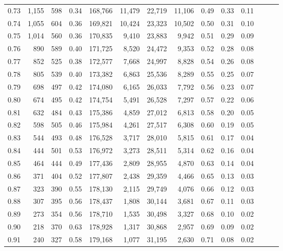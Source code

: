 \begin{tabular}{rrrrrrrrrrrrrr}
0.73 &  1,155 &  598 &  0.34 &  168,766 &   11,479 &  22,719 &  11,106 &  0.49 &  0.33 &      0.11 \\
0.74 &  1,055 &  604 &  0.36 &  169,821 &   10,424 &  23,323 &  10,502 &  0.50 &  0.31 &      0.10 \\
0.75 &  1,014 &  560 &  0.36 &  170,835 &    9,410 &  23,883 &   9,942 &  0.51 &  0.29 &      0.09 \\
0.76 &    890 &  589 &  0.40 &  171,725 &    8,520 &  24,472 &   9,353 &  0.52 &  0.28 &      0.08 \\
0.77 &    852 &  525 &  0.38 &  172,577 &    7,668 &  24,997 &   8,828 &  0.54 &  0.26 &      0.08 \\
0.78 &    805 &  539 &  0.40 &  173,382 &    6,863 &  25,536 &   8,289 &  0.55 &  0.25 &      0.07 \\
0.79 &    698 &  497 &  0.42 &  174,080 &    6,165 &  26,033 &   7,792 &  0.56 &  0.23 &      0.07 \\
0.80 &    674 &  495 &  0.42 &  174,754 &    5,491 &  26,528 &   7,297 &  0.57 &  0.22 &      0.06 \\
0.81 &    632 &  484 &  0.43 &  175,386 &    4,859 &  27,012 &   6,813 &  0.58 &  0.20 &      0.05 \\
0.82 &    598 &  505 &  0.46 &  175,984 &    4,261 &  27,517 &   6,308 &  0.60 &  0.19 &      0.05 \\
0.83 &    544 &  493 &  0.48 &  176,528 &    3,717 &  28,010 &   5,815 &  0.61 &  0.17 &      0.04 \\
0.84 &    444 &  501 &  0.53 &  176,972 &    3,273 &  28,511 &   5,314 &  0.62 &  0.16 &      0.04 \\
0.85 &    464 &  444 &  0.49 &  177,436 &    2,809 &  28,955 &   4,870 &  0.63 &  0.14 &      0.04 \\
0.86 &    371 &  404 &  0.52 &  177,807 &    2,438 &  29,359 &   4,466 &  0.65 &  0.13 &      0.03 \\
0.87 &    323 &  390 &  0.55 &  178,130 &    2,115 &  29,749 &   4,076 &  0.66 &  0.12 &      0.03 \\
0.88 &    307 &  395 &  0.56 &  178,437 &    1,808 &  30,144 &   3,681 &  0.67 &  0.11 &      0.03 \\
0.89 &    273 &  354 &  0.56 &  178,710 &    1,535 &  30,498 &   3,327 &  0.68 &  0.10 &      0.02 \\
0.90 &    218 &  370 &  0.63 &  178,928 &    1,317 &  30,868 &   2,957 &  0.69 &  0.09 &      0.02 \\
0.91 &    240 &  327 &  0.58 &  179,168 &    1,077 &  31,195 &   2,630 &  0.71 &  0.08 &      0.02 \\

\end{tabular}
